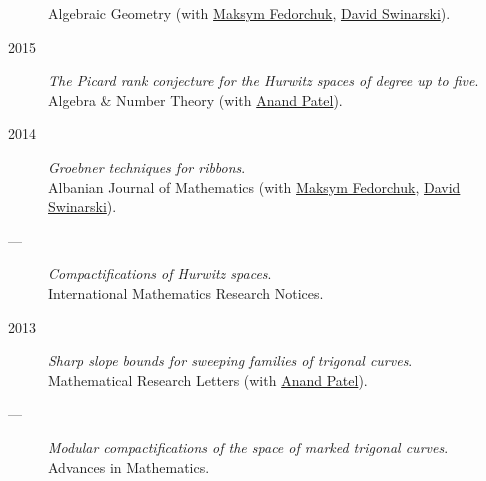 \documentclass[11pt]{article}
\begin{document}
\begin{description}
Algebraic Geometry (with \href{https://www2.bc.edu/maksym-fedorchuk/}{Maksym Fedorchuk}, \href{http://faculty.fordham.edu/dswinarski/}{David Swinarski}).
\item[{2015}] \emph{The Picard rank conjecture for the Hurwitz spaces of degree up to five}.\\
Algebra \& Number Theory (with \href{https://www2.bc.edu/anand-p-patel/}{Anand Patel}).
\item[{2014}] \emph{Groebner techniques for ribbons}.\\
Albanian Journal of Mathematics (with \href{https://www2.bc.edu/maksym-fedorchuk/}{Maksym Fedorchuk}, \href{http://faculty.fordham.edu/dswinarski/}{David Swinarski}).
\item[{---}] \emph{Compactifications of Hurwitz spaces}.\\
International Mathematics Research Notices.
\item[{2013}] \emph{Sharp slope bounds for sweeping families of trigonal curves}.\\
Mathematical Research Letters (with \href{https://sites.google.com/view/anand-patel}{Anand Patel}).
\item[{---}] \emph{Modular compactifications of the space of marked trigonal curves}.\\
Advances in Mathematics.
\end{description}
\end{document}

